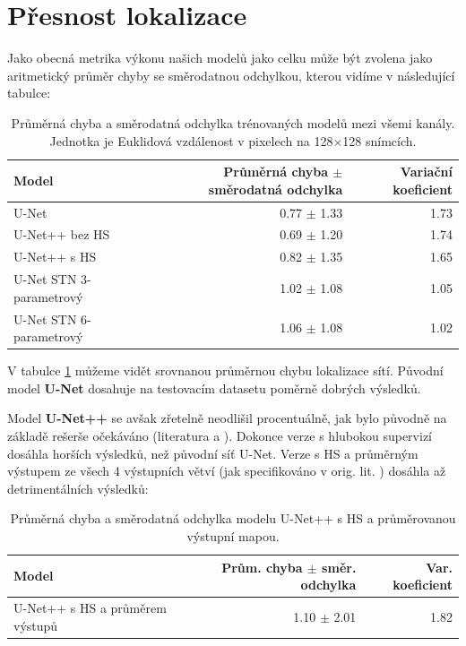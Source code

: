 \section{Přesnost lokalizace}
\label{sec:Chapter62}

Jako obecná metrika výkonu našich modelů jako celku může být zvolena jako aritmetický průměr chyby se směrodatnou odchylkou, kterou vidíme v následující tabulce:
\begin{table}[H]
    \centering
    \begin{tabular}{lrr}
        \toprule
        Model & Průměrná chyba $\pm$ směrodatná odchylka & Variační koeficient \\
        \midrule
        U-Net & 0.77 $\pm$ 1.33 & 1.73 \\
        U-Net++ bez HS & 0.69 $\pm$ 1.20 & 1.74 \\
        U-Net++ s HS & 0.82 $\pm$ 1.35 & 1.65 \\
        U-Net STN 3-parametrový & 1.02 $\pm$ 1.08 & 1.05 \\
        U-Net STN 6-parametrový & 1.06 $\pm$ 1.08 & 1.02 \\
        \bottomrule   
    \end{tabular}
    \caption[Průměrná chyba a směrodatná odchylka trénovaných modelů]{Průměrná chyba a směrodatná odchylka trénovaných modelů mezi všemi kanály. Jednotka je Euklidová vzdálenost v pixelech na 128$\times$128 snímcích.}
    \label{fig:mean_std_no_channel}
\end{table}

V tabulce \ref{fig:mean_std_no_channel} můžeme vidět srovnanou průměrnou chybu lokalizace sítí. Původní model \textbf{U-Net} dosahuje na testovacím datasetu poměrně dobrých výsledků. 

Model \textbf{U-Net++} se avšak zřetelně neodlišil procentuálně, jak bylo původně na základě rešerše očekáváno (literatura \cite{unetpp} a \cite{unet_comparison}). Dokonce verze s hlubokou supervizí dosáhla horších výsledků, než původní síť U-Net. Verze s HS a průměrným výstupem ze všech 4 výstupních větví (jak specifikováno v orig. lit. \cite{unetpp}) dosáhla až detrimentálních výsledků:
\begin{table}[H]
    \centering
    \begin{tabular}{lrr}
        \toprule
        Model & Prům. chyba $\pm$ směr. odchylka & Var. koeficient \\
        \midrule
        U-Net++ s HS a průměrem výstupů & 1.10 $\pm$ 2.01 & 1.82 \\
    \end{tabular}
    \caption[Průměrná chyba a směrodatná odchylka modelu původní sítě U-Net++ s HS]{Průměrná chyba a směrodatná odchylka modelu U-Net++ s HS a průměrovanou výstupní mapou.}
    \label{fig:mean_std_no_channel_unetpp_fail}
\end{table}

